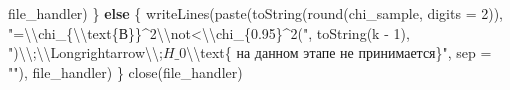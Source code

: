 \documentclass[
]{article}
\newenvironment{Shaded}{\begin{snugshade}}{\end{snugshade}}
\newcommand{\AttributeTok}[1]{\textcolor[rgb]{0.77,0.63,0.00}{#1}}
\newcommand{\ControlFlowTok}[1]{\textcolor[rgb]{0.13,0.29,0.53}{\textbf{#1}}}
\newcommand{\DecValTok}[1]{\textcolor[rgb]{0.00,0.00,0.81}{#1}}
\newcommand{\FunctionTok}[1]{\textcolor[rgb]{0.00,0.00,0.00}{#1}}
\newcommand{\NormalTok}[1]{#1}
\newcommand{\SpecialCharTok}[1]{\textcolor[rgb]{0.00,0.00,0.00}{#1}}
\newcommand{\StringTok}[1]{\textcolor[rgb]{0.31,0.60,0.02}{#1}}
\begin{document}
\begin{Shaded}
\begin{Highlighting}[]
\NormalTok{        file\_handler)}
\NormalTok{\} }\ControlFlowTok{else}\NormalTok{ \{}
    \FunctionTok{writeLines}\NormalTok{(}\FunctionTok{paste}\NormalTok{(}\FunctionTok{toString}\NormalTok{(}\FunctionTok{round}\NormalTok{(chi\_sample, }\AttributeTok{digits =} \DecValTok{2}\NormalTok{)), }\StringTok{"=}\SpecialCharTok{\textbackslash{}\textbackslash{}}\StringTok{chi\_\{}\SpecialCharTok{\textbackslash{}\textbackslash{}}\StringTok{text\{В\}\}\^{}2}\SpecialCharTok{\textbackslash{}\textbackslash{}}\StringTok{not\textless{}}\SpecialCharTok{\textbackslash{}\textbackslash{}}\StringTok{chi\_\{0.95\}\^{}2("}\NormalTok{, }
        \FunctionTok{toString}\NormalTok{(k }\SpecialCharTok{{-}} \DecValTok{1}\NormalTok{), }\StringTok{")}\SpecialCharTok{\textbackslash{}\textbackslash{}}\StringTok{;}\SpecialCharTok{\textbackslash{}\textbackslash{}}\StringTok{Longrightarrow}\SpecialCharTok{\textbackslash{}\textbackslash{}}\StringTok{;$H\_0$}\SpecialCharTok{\textbackslash{}\textbackslash{}}\StringTok{text\{ на данном этапе не принимается\}"}\NormalTok{, }
        \AttributeTok{sep =} \StringTok{""}\NormalTok{), file\_handler)}
\NormalTok{\}}
\FunctionTok{close}\NormalTok{(file\_handler)}
\end{Highlighting}
\end{Shaded}
\end{document}
